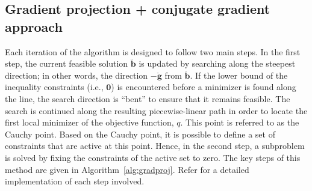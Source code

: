 \documentclass[11pt]{article}
\newcommand{\0}{\phantom{0}}
\begin{document}


\subsection{Gradient projection + conjugate gradient approach}

Each iteration of the algorithm is designed to follow two main steps. In the first step, the current feasible solution $\ddot{\bm{b}}$ is updated by searching along the steepest direction; in other words, the direction $-\ddot{\bm{g}}$ from $\ddot{\bm{b}}$. If the lower bound of the inequality constraints (i.e., $\bm{0}$) is encountered before a minimizer is found along the line, the search direction is ``bent'' to ensure that it remains feasible. The search is continued along the resulting piecewise-linear path in order to locate the first local minimizer of the objective function, $q$. This point is referred to as the Cauchy point. Based on the Cauchy point, it is possible to define a set of constraints that are active at this point. Hence, in the second step, a subproblem is solved by fixing the constraints of the active set to zero. The key steps of this method are given in Algorithm~\ref{alg:gradproj}. Refer \citet{Nocedal2006} for a detailed implementation of each step involved.
\end{document}
